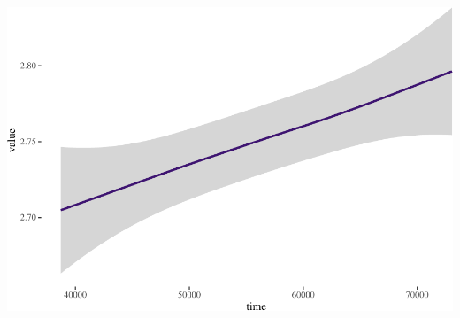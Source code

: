 \documentclass[
  paper=a4,
  ,captions=tableheading
]{scrartcl}
\begin{document}
\includegraphics{Haskell_files/figure-latex/unnamed-chunk-54-2.pdf}
\end{document}
